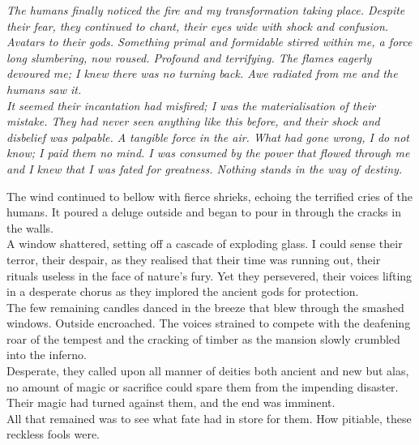
{\itshape%
	The humans finally noticed the fire and my transformation taking place. Despite their fear, they continued to chant, their eyes wide with shock and confusion. Avatars to their gods. Something primal and formidable stirred within me, a force long slumbering, now roused. Profound and terrifying. The flames eagerly devoured me; I knew there was no turning back. Awe radiated from me and the humans saw it. \\
	It seemed their incantation had misfired; I was the materialisation of their mistake. They had never seen anything like this before, and their shock and disbelief was palpable. A tangible force in the air. What had gone wrong, I do not know; I paid them no mind. I was consumed by the power that flowed through me and I knew that I was fated for greatness. Nothing stands in the way of destiny. \\
}

The wind continued to bellow with fierce shrieks, echoing the terrified cries of the humans. It poured a deluge outside and began to pour in through the cracks in the walls. \\
A window shattered, setting off a cascade of exploding glass. I could sense their terror, their despair, as they realised that their time was running out, their rituals useless in the face of nature's fury. Yet they persevered, their voices lifting in a desperate chorus as they implored the ancient gods for protection. \\
The few remaining candles danced in the breeze that blew through the smashed windows. Outside encroached. The voices strained to compete with the deafening roar of the tempest and the cracking of timber as the mansion slowly crumbled into the inferno. \\
Desperate, they called upon all manner of deities both ancient and new but alas, no amount of magic or sacrifice could spare them from the impending disaster. Their magic had turned against them, and the end was imminent. \\
All that remained was to see what fate had in store for them. How pitiable, these reckless fools were. \\

